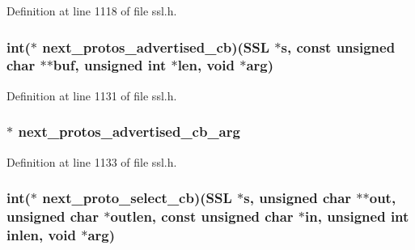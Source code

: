 Definition at line 1118 of file ssl.\+h.

\subsubsection[{\texorpdfstring{next\+\_\+protos\+\_\+advertised\+\_\+cb}{next_protos_advertised_cb}}]{\setlength{\rightskip}{0pt plus 5cm}int($\ast$ next\+\_\+protos\+\_\+advertised\+\_\+cb)({\bf S\+SL} $\ast$s, const unsigned char $\ast$$\ast$buf, unsigned int $\ast${\bf len}, {\bf void} $\ast$arg)}\hypertarget{structssl__ctx__st_a787a303e9d0bb9531d6a73cb05812c68}{}\label{structssl__ctx__st_a787a303e9d0bb9531d6a73cb05812c68}


Definition at line 1131 of file ssl.\+h.

\subsubsection[{\texorpdfstring{next\+\_\+protos\+\_\+advertised\+\_\+cb\+\_\+arg}{next_protos_advertised_cb_arg}}]{ $\ast$ next\+\_\+protos\+\_\+advertised\+\_\+cb\+\_\+arg}\hypertarget{structssl__ctx__st_ab31e2b0b3e8338b7130dd85f1c15cbe1}{}\label{structssl__ctx__st_ab31e2b0b3e8338b7130dd85f1c15cbe1}


Definition at line 1133 of file ssl.\+h.

\subsubsection[{\texorpdfstring{next\+\_\+proto\+\_\+select\+\_\+cb}{next_proto_select_cb}}]{\setlength{\rightskip}{0pt plus 5cm}int($\ast$ next\+\_\+proto\+\_\+select\+\_\+cb)({\bf S\+SL} $\ast$s, unsigned char $\ast$$\ast$out, unsigned char $\ast$outlen, const unsigned char $\ast$in, unsigned int inlen, {\bf void} $\ast$arg)}\hypertarget{structssl__ctx__st_abaf00647cd8e47465b90a593daf9c487}{}\label{structssl__ctx__st_abaf00647cd8e47465b90a593daf9c487}


